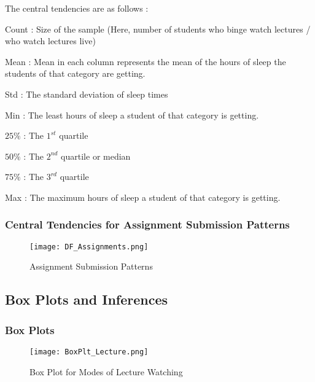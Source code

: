 \documentclass[11pt,]{beamer}
\begin{document}
\begin{frame}

The central tendencies are as follows : 
    
    \begin{block}
    
    Count : Size of the sample (Here, number of students who binge watch lectures / who watch lectures live)
    
    \smallskip
    
    Mean : Mean in each column represents the mean of the hours of sleep the students of that category are getting. 
    
    \smallskip
    
    Std : The standard deviation of sleep times
    
    \smallskip
    
    Min : The least hours of sleep a student of that category is getting.
    
    \smallskip
    
    $25\%$ : The $1^{st}$ quartile
    
    \smallskip
    
    $50\%$ : The $2^{nd}$ quartile or median
    
    \smallskip
    
    $75\%$ : The $3^{rd}$ quartile 
    
    \smallskip
    
    Max : The maximum hours of sleep a student of that category is getting. 
    
    \end{block}
    
\end{frame}

\begin{frame}

    \frametitle{Central Tendencies for Assignment Submission Patterns}
    
    \begin{figure}
		\texttt{[image: DF\_Assignments.png]}
		\caption{Assignment Submission Patterns}
	\end{figure}
    
\end{frame}

\subsection{Box Plots and Inferences}

\begin{frame}

    \frametitle{Box Plots}
    
    \begin{figure}
		\texttt{[image: BoxPlt\_Lecture.png]}
		\caption{Box Plot for Modes of Lecture Watching}
	\end{figure}
	
\end{frame}
\end{document}
